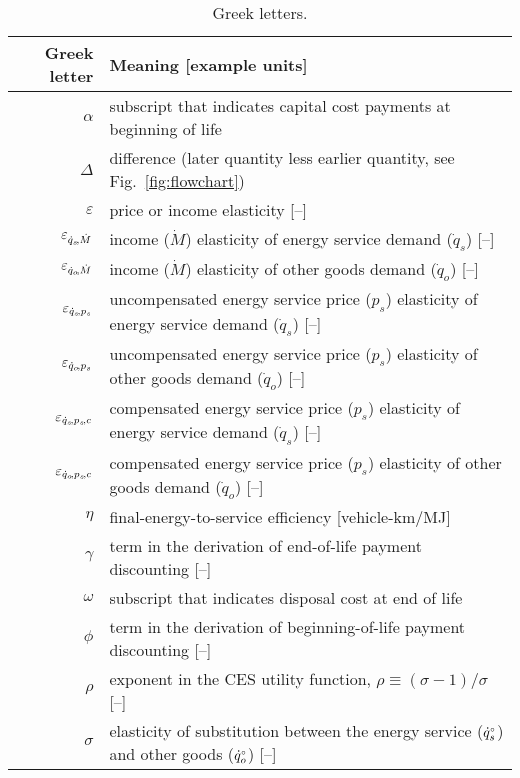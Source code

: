 
\begin{table}
\footnotesize
\centering %
\caption{Greek letters.}
\begin{tabular}{r l}
  \toprule
  Greek letter & Meaning [example units] \\
  \midrule
  $\alpha$       & subscript that indicates capital cost payments at beginning of life \\
  $\Delta$       & difference (later quantity less earlier quantity, see Fig.~\ref{fig:flowchart}) \\
  $\varepsilon$  & price or income elasticity [--] \\
  $\varepsilon_{\dot{q}_s\!,\dot{M}}$        & income ($\dot{M}$) elasticity of energy service demand ($\dot{q}_s$) [--] \\
  $\varepsilon_{\dot{q}_o\!,\dot{M}}$        & income ($\dot{M}$) elasticity of other goods demand ($\dot{q}_o$) [--] \\
  $\varepsilon_{\dot{q}_s\!,p_s}$     & uncompensated energy service price ($p_s$) elasticity of energy service demand ($\dot{q}_s$) [--] \\
  $\varepsilon_{\dot{q}_o\!,p_s}$     & uncompensated energy service price ($p_s$) elasticity of other goods demand ($\dot{q}_o$) [--] \\
  $\varepsilon_{\dot{q}_s\!,p_s\!,c}$      & compensated energy service price ($p_s$) elasticity of energy service demand ($\dot{q}_s$) [--] \\
  $\varepsilon_{\dot{q}_o\!,p_s\!,c}$      & compensated energy service price ($p_s$) elasticity of other goods demand ($\dot{q}_o$) [--] \\
  $\eta$         & final-energy-to-service efficiency [vehicle-km/MJ] \\
  $\gamma$       & term in the derivation of end-of-life payment discounting [--] \\
  $\omega$       & subscript that indicates disposal cost at end of life \\
  $\phi$         & term in the derivation of beginning-of-life payment discounting [--] \\
  $\rho$         & exponent in the CES utility function, $\rho \equiv (\sigma - 1) / \sigma$ [--] \\
  $\sigma$       & elasticity of substitution between the energy service (${}{\dot{q}}^{\scriptscriptstyle \circ}_s$) and other goods (${}{\dot{q}}^{\scriptscriptstyle \circ}_o$) [--] \\
  \bottomrule
\end{tabular}
\label{tab:greek}
\end{table}



